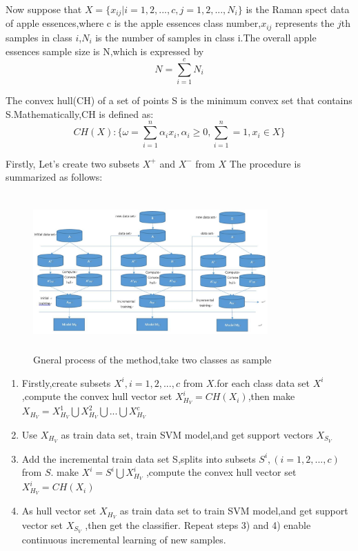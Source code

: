 \documentclass[a4paper]{article}
\begin{document}
Now suppose that $X =\{x_{ij} | i = 1,2,...,c,j=1,2,...,N_i\}$ is the Raman spect data of  apple essences,where c is the apple essences class number,$x_{ij}$ represents the $j$th samples in class $i$,$N_i$ is the number of samples in class i.The overall apple essences sample size is N,which is expressed by
$$N = \sum _{i=1} ^{c} N_i$$

The convex hull(CH) of a set of points S is the minimum convex set that contains S.Mathematically,CH is defined as:
$$
CH(X) :\{ \omega = \sum_{i=1} ^{n} \alpha_i x_i, \alpha_i \geq 0, \sum_{i=1} ^{n} = 1, x_i \in X \}
$$

Firstly, Let's create two subsets $X^+$ and $X^-$ from $X$
The procedure is summarized as follows:
\begin{figure}[h]
  \centering
  \includegraphics[width=9cm,height=6cm]{算法示意图}
  \caption{Gneral process of the method,take two classes as sample}
\end{figure}

\begin{enumerate}
\item Firstly,create subsets $X^i, i= 1,2,...,c$ from $X$.for each class data set $X^{i}$ ,compute the convex hull vector set $X ^{i}_{H_{V}} = CH(X_i)$,then make  $ X_{H_{V}} =X ^{1}_{H_{V}}  \bigcup X ^{2}_{H_{V}} \bigcup ...\bigcup X ^{c}_{H_{V}} $

\item Use $X_{H_{V}}$ as train data set, train SVM model,and get support vectors $X_{S_{V}}$

\item Add the incremental train data set S,splits into subsets $S^i ,( i= 1,2,...,c)$ from $S$.
make $X^i = S^i \bigcup X^i _{H_{V}}$ ,compute the convex hull vector set $X ^{i}_{H_{V}} = CH(X_i)$

\item As hull vector set $X_{H_{V}}$ as train data set to train SVM model,and get support vector set $X_{S_{V}}$ ,then get the classifier.
Repeat steps 3) and 4) enable continuous incremental learning of new samples.
\end{enumerate}
\end{document}
